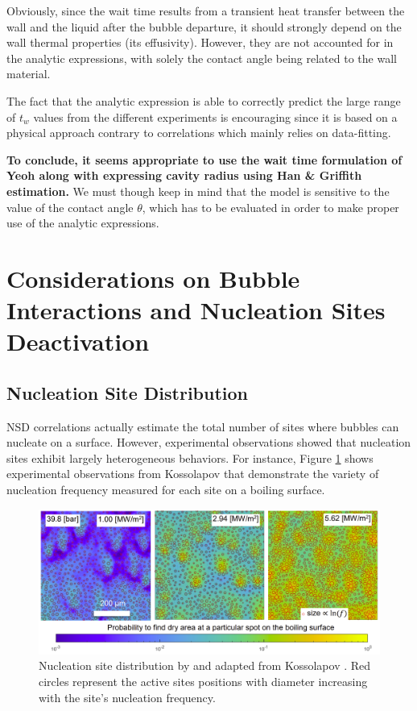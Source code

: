 \begin{remark*}{}
Obviously, since the wait time results from a transient heat transfer between the wall and the liquid after the bubble departure, it should strongly depend on the wall thermal properties (\eg its effusivity). However, they are not accounted for in the analytic expressions, with solely the contact angle being related to the wall material. 
\end{remark*}

The fact that the analytic expression is able to correctly predict the large range of $t_{w}$ values from the different experiments is encouraging since it is based on a physical approach contrary to correlations which mainly relies on data-fitting.

\npar
\textbf{To conclude, it seems appropriate to use the wait time formulation of Yeoh \etal along with expressing cavity radius using Han \& Griffith estimation.} We must though keep in mind that the model is sensitive to the value of the contact angle $\theta$, which has to be evaluated in order to make proper use of the analytic expressions.


\section{Considerations on Bubble Interactions and Nucleation Sites Deactivation}
\label{sec:site_interactions}

\subsection{Nucleation Site Distribution}

NSD correlations actually estimate the total number of sites where bubbles can nucleate on a surface. However, experimental observations showed that nucleation sites exhibit largely heterogeneous behaviors. For instance, Figure \ref{fig:sites_f_koss} shows experimental observations from Kossolapov \cite{kossolapov_experimental_2021} that demonstrate the variety of nucleation frequency measured for each site on a boiling surface.

\begin{figure}[!h]
\centering
\includegraphics[width=0.9\linewidth]{img/site_interaction/site_f_kossolapov.PNG}
\caption{Nucleation site distribution by and adapted from Kossolapov \cite{kossolapov_experimental_2021}. Red circles represent the active sites positions with diameter increasing with the site's nucleation frequency.}
\label{fig:sites_f_koss}
\end{figure}

